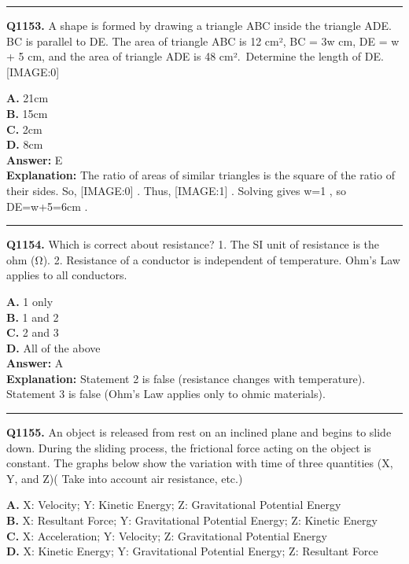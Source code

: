 \documentclass[12pt]{article}
\begin{document}
\hrule
\vspace{1em}


\noindent
\textbf{Q1153.} A shape is formed by drawing a triangle ABC inside the triangle ADE. BC is parallel to DE. The area of triangle ABC is 12 cm², BC = 3w cm, DE = w + 5 cm, and the area of triangle ADE is 48 cm². Determine the length of DE.
[IMAGE:0]



\textbf{A.} 21cm \\
\textbf{B.} 15cm \\
\textbf{C.} 2cm \\
\textbf{D.} 8cm \\

\textbf{Answer:} E \\
\textbf{Explanation:} The ratio of areas of similar triangles is the square of the ratio of their sides. So,
[IMAGE:0]
. Thus,
[IMAGE:1]
. Solving gives w=1
, so DE=w+5=6cm
.

\hrule
\vspace{1em}


\noindent
\textbf{Q1154.} Which is correct about resistance?
1.
The SI unit of resistance is the ohm (Ω).
2.
Resistance of a conductor is independent of temperature.
Ohm’s Law applies to all conductors.



\textbf{A.} 1 only \\
\textbf{B.} 1 and 2 \\
\textbf{C.} 2 and 3 \\
\textbf{D.} All of the above \\

\textbf{Answer:} A \\
\textbf{Explanation:} Statement 2 is false (resistance changes with temperature). Statement 3 is false (Ohm’s Law applies only to ohmic materials).

\hrule
\vspace{1em}


\noindent
\textbf{Q1155.} An object is released from rest on an inclined plane and begins to slide down. During the sliding process, the frictional force acting on the object is constant. The graphs below show the variation with time of three quantities (X, Y, and Z)( Take into account air resistance, etc.)



\textbf{A.} X: Velocity; Y: Kinetic Energy; Z: Gravitational Potential Energy \\
\textbf{B.} X: Resultant Force; Y: Gravitational Potential Energy; Z: Kinetic Energy \\
\textbf{C.} X: Acceleration; Y: Velocity; Z: Gravitational Potential Energy \\
\textbf{D.} X: Kinetic Energy; Y: Gravitational Potential Energy; Z: Resultant Force \\
\end{document}
